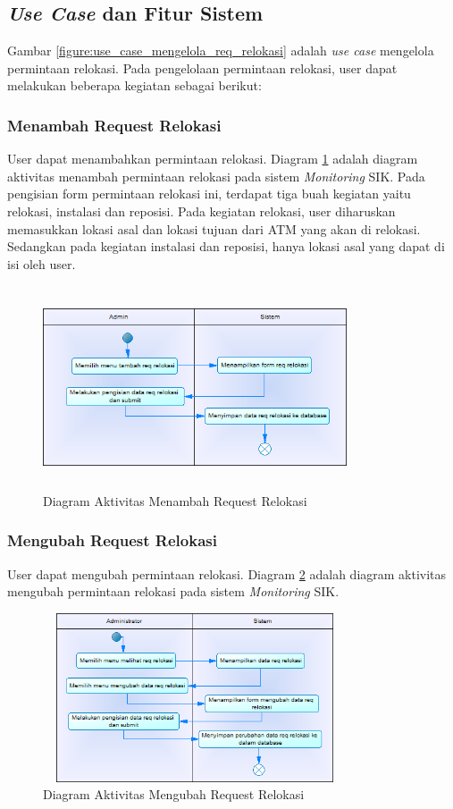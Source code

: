 \subsection{\textit{Use Case} dan Fitur Sistem}
Gambar \ref{figure:use_case_mengelola_req_relokasi} adalah \textit{use case} mengelola permintaan relokasi. Pada pengelolaan permintaan relokasi, user dapat melakukan beberapa kegiatan sebagai berikut:
	\subsubsection{Menambah Request Relokasi}
	User dapat menambahkan permintaan relokasi. Diagram \ref{figure:activity_menambah_req_relokasi} adalah diagram aktivitas menambah permintaan relokasi pada sistem \textit{Monitoring} SIK. Pada pengisian form permintaan relokasi ini, terdapat tiga buah kegiatan yaitu relokasi, instalasi dan reposisi. Pada kegiatan relokasi, user diharuskan memasukkan lokasi asal dan lokasi tujuan dari ATM yang akan di relokasi. Sedangkan pada kegiatan instalasi dan reposisi, hanya lokasi asal yang dapat di isi oleh user.
	\begin{figure}[h]
	\centerline {\includegraphics[width=9cm,height=6cm]{bab4/ActivityDiagram_MenambahkanReqRelokasi.png}}
	\caption{Diagram Aktivitas Menambah Request Relokasi}
	\label{figure:activity_menambah_req_relokasi}
	\end{figure}
		
	\subsubsection{Mengubah Request Relokasi}
	User dapat mengubah permintaan relokasi. Diagram \ref{figure:activity_mengubah_req_relokasi} adalah diagram aktivitas mengubah permintaan relokasi pada sistem \textit{Monitoring} SIK.
	\begin{figure}[h]
	\centerline {\includegraphics[width=9cm,height=5cm]{bab4/ActivityDiagram_MengubahReqRelokasi.png}}
	\caption{Diagram Aktivitas Mengubah Request Relokasi}
	\label{figure:activity_mengubah_req_relokasi}
	\end{figure}

